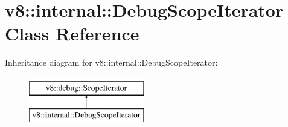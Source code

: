 \hypertarget{classv8_1_1internal_1_1DebugScopeIterator}{}\section{v8\+:\+:internal\+:\+:Debug\+Scope\+Iterator Class Reference}
\label{classv8_1_1internal_1_1DebugScopeIterator}
Inheritance diagram for v8\+:\+:internal\+:\+:Debug\+Scope\+Iterator\+:\begin{figure}[H]
\begin{center}
\leavevmode
\includegraphics[height=2.000000cm]{classv8_1_1internal_1_1DebugScopeIterator}
\end{center}
\end{figure}
